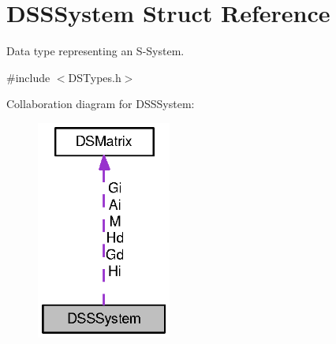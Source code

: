 \hypertarget{struct_d_s_s_system}{
\section{DSSSystem Struct Reference}
\label{struct_d_s_s_system}
}


Data type representing an S-\/System.  




{\ttfamily \#include $<$DSTypes.h$>$}



Collaboration diagram for DSSSystem:\nopagebreak
\begin{figure}[H]
\begin{center}
\leavevmode
\includegraphics[width=125pt]{struct_d_s_s_system__coll__graph}
\end{center}
\end{figure}
